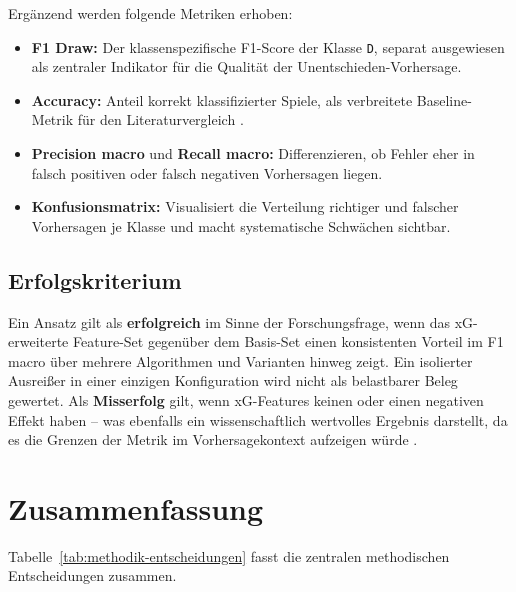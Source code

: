 Ergänzend werden folgende Metriken erhoben:

\begin{itemize}
    \item \textbf{F1 Draw:} Der klassenspezifische F1-Score der
          Klasse \texttt{D}, separat ausgewiesen als zentraler
          Indikator für die Qualität der Unentschieden-Vorhersage.
    \item \textbf{Accuracy:} Anteil korrekt klassifizierter Spiele,
          als verbreitete Baseline-Metrik für den Literaturvergleich
          \cite{BunkerThabtah2019,HubacekSourekZelezny2019}.
    \item \textbf{Precision macro} und \textbf{Recall macro:}
          Differenzieren, ob Fehler eher in falsch positiven oder
          falsch negativen Vorhersagen liegen.
    \item \textbf{Konfusionsmatrix:} Visualisiert die Verteilung
          richtiger und falscher Vorhersagen je Klasse und macht
          systematische Schwächen sichtbar.
\end{itemize}

\subsection{Erfolgskriterium}

Ein Ansatz gilt als \textbf{erfolgreich} im Sinne der Forschungsfrage,
wenn das xG-erweiterte Feature-Set gegenüber dem Basis-Set einen
konsistenten Vorteil im F1 macro über mehrere Algorithmen und Varianten
hinweg zeigt. Ein isolierter Ausreißer in einer einzigen Konfiguration
wird nicht als belastbarer Beleg gewertet. Als \textbf{Misserfolg} gilt,
wenn xG-Features keinen oder einen negativen Effekt haben -- was
ebenfalls ein wissenschaftlich wertvolles Ergebnis darstellt, da es
die Grenzen der Metrik im Vorhersagekontext aufzeigen würde
\cite{AnzerBauer2021,VanEetveldeEtAl2024}.

\section{Zusammenfassung}
\label{sec:methodik-zusammenfassung}

Tabelle~\ref{tab:methodik-entscheidungen} fasst die zentralen
methodischen Entscheidungen zusammen.

